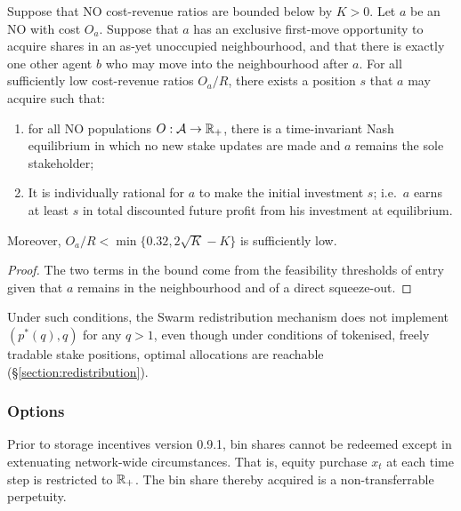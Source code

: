 \begin{proposition*}

  Suppose that NO cost-revenue ratios are bounded below by $K>0$.
  Let $a$ be an NO with cost $O_a$. 
  Suppose that $a$ has an exclusive first-move opportunity to acquire shares in an as-yet unoccupied neighbourhood, and that there is exactly one other agent $b$ who may move into the neighbourhood after $a$.
  For all sufficiently low cost-revenue ratios $O_a/R$, there exists a position $s$ that $a$ may acquire such that:
  \begin{enumerate}
    \item for all NO populations $O:\mathcal{A}\rightarrow\mathbb{R}_+$, there is a time-invariant Nash equilibrium in which no new stake updates are made and $a$ remains the sole stakeholder;
    \item It is individually rational for $a$ to make the initial investment $s$; i.e.~$a$ earns at least $s$ in total discounted future profit from his investment at equilibrium.
  \end{enumerate}
  Moreover, $O_a/R < \min\{0.32, 2\sqrt{K}-K\}$ is sufficiently low.

\end{proposition*}
%
\begin{proof}

  The two terms in the bound come from the feasibility thresholds of entry given that $a$ remains in the neighbourhood and of a direct squeeze-out. \qedhere

\end{proof}

Under such conditions, the Swarm redistribution mechanism does not implement $(p^*(q),q)$ for any $q>1$, even though under conditions of tokenised, freely tradable stake positions, optimal allocations are reachable (\S\ref{section:redistribution}).


\subsubsection{Options}

Prior to storage incentives version 0.9.1, bin shares cannot be redeemed except in extenuating network-wide circumstances.
%
That is, equity purchase $x_t$ at each time step is restricted to $\mathbb{R}_+$.
%
The bin share thereby acquired is a non-transferrable perpetuity.

